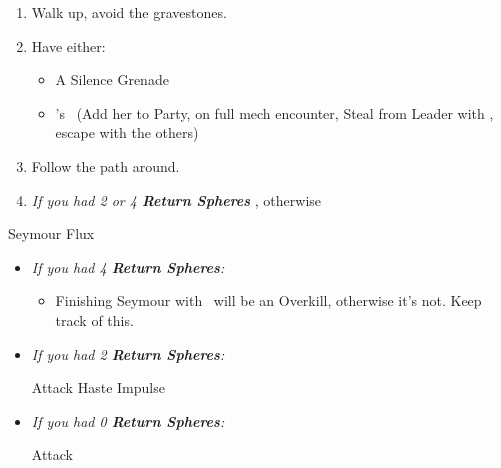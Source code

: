 \begin{enumerate}[resume]
    \item Walk up, avoid the gravestones.
    \item Have either:
    \begin{itemize}
        \item A Silence Grenade
        \item \rikku's \od\ (Add her to Party, on full mech encounter, Steal from Leader with \rikku, escape with the others)
    \end{itemize}
    \item Follow the path around.
    \item \textit{If you had 2 or 4 \textbf{Return Spheres}} \formation{\tidus}{\yuna}{\auron}, otherwise \formation{\tidus}{\kimahri}{\wakka}
\end{enumerate}
\begin{battle}[70000]{Seymour Flux}
    \begin{itemize}
        \item \textit{If you had 4 \textbf{Return Spheres}:}
        \begin{itemize}
            \yunaf Attack
            \tidusf Haste \yuna
            \switch{\auron}{\rikku}
            \rikkuf Use Silence Grenade or  \od\ HP Sphere + Grenade
            \summon{\bahamut}
            \bahamutf \textit{If you used a Silence Grenade} Impulse, otherwise Attack
            \enemyf Banishes Bahamut
            \yunaf Attack
            \tidusf \textit{If you used a Silence Grenade} Attack once, otherwise Defend
            \rikkuf Defend
            \item Finishing Seymour with \yuna\ will be an Overkill, otherwise it's not. Keep track of this.
        \end{itemize}
        \item \textit{If you had 2 \textbf{Return Spheres}:}
        \begin{itemize}
            \yunaf Attack
            \tidusf Haste \yuna
            \summon{\bahamut}
            \bahamutf Impulse
        \end{itemize}
        \item \textit{If you had 0 \textbf{Return Spheres}:}
        \begin{itemize}
            \switch{\tidus}{\yuna}
            \summon{\bahamut}
            \bahamutf Attack
        \end{itemize}
    \end{itemize}
\end{battle}

